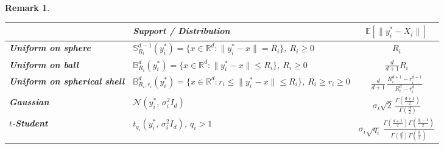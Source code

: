\documentclass[letter,11pt, reqno]{amsart}
\newcommand{\R}{\mathbb{R}}
\newcommand{\E}{\mathbb{E}}
\renewcommand{\;}{\quad}
\theoremstyle{thmstyleone}%
\theoremstyle{thmstyletwo}%
\newtheorem{remark}{Remark}%
\theoremstyle{thmstylethree}%
\begin{document}
\begin{remark}
\centering
\renewcommand{\arraystretch}{1.5}
\setlength{\tabcolsep}{6pt}
\begin{adjustbox}{width=0.85\textwidth}
\begin{tabular}{l l c}
\cmidrule{2-3}
 & \textbf{Support / Distribution} &
$\displaystyle \mathbb{E}\left[\|y_i^* - X_i\|\right]$ \\ 
\midrule
\textbf{Uniform on sphere} &
$\mathbb{S}^{d-1}_{R_i}(y_i^*)=\{x\in\R^d:\|y_i^*-x\|=R_i\}$, $R_i\geq 0$ &
$\displaystyle R_i$ \\[2ex]

\textbf{Uniform on ball} &
$\mathbb{B}^d_{R_i}(y_i^*)=\{x\in\R^d:\|y_i^*-x\|\le R_i\}$, $R_i\geq 0$ &
$\displaystyle \frac{d}{d+1}R_i$ \\[2ex]

\textbf{Uniform on spherical shell} &
$\mathbb{B}^d_{R_i,r_i}(y_i^*)=\{x\in\R^d:r_i\le\|y_i^*-x\|\le R_i\}$, $R_i\geq r_i \geq 0$ &
$\displaystyle 
\frac{d}{d+1}\,
\frac{R_i^{d+1}-r_i^{d+1}}{R_i^{d}-r_i^{d}}$ \\[2ex]

\textbf{Gaussian} &
$\mathcal{N}(y_i^*,\,\sigma_i^2 I_d)$ &
$\displaystyle 
\sigma_i\sqrt{2}\,
\frac{\Gamma\!\left(\frac{d+1}{2}\right)}
     {\Gamma\!\left(\frac{d}{2}\right)}$ \\[2ex]

$t$-\textbf{Student} &
$t_{q_i}(y_i^*,\,\sigma_i^2 I_d)$, $q_i>1$ &
$\displaystyle 
\sigma_i\sqrt{q_i}\,
\frac{
\Gamma\!\left(\frac{d+1}{2}\right)
\Gamma\!\left(\frac{q_i-1}{2}\right)
}{
\Gamma\!\left(\frac{d}{2}\right)
\Gamma\!\left(\frac{q_i}{2}\right)
}$ \\
\bottomrule
\end{tabular}
\end{adjustbox}
\end{remark}
\end{document}
